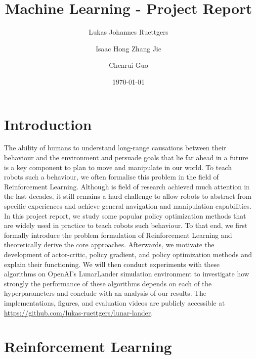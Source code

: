 \documentclass[a4paper, 11pt]{article}
\title{Machine Learning -  Project Report}
\author{Lukas Johannes Ruettgers \and Isaac Hong Zhang Jie \and Chenrui Guo}
\date{\today}
\begin{document}
	\maketitle
	\section{Introduction}
	The ability of humans to understand long-range causations between their behaviour and the environment and persuade goals that lie far ahead in a future is a key component to plan to move and manipulate in our world.
	To teach robots such a behaviour, we often formalise this problem in the field of Reinforcement Learning. Although is field of research achieved much attention in the last decades, it still remains a hard challenge to allow robots to abstract from specific experiences and achieve general navigation and manipulation capabilities. In this project report, we study some popular policy optimization methods that are widely used in practice to teach robots such behaviour.
	To that end, we first formally introduce the problem formulation of Reinforcement Learning and theoretically derive the core approaches. Afterwards, we motivate the development of actor-critic, policy gradient, and policy optimization methods and explain their functioning.
	We will then conduct experiments with these algorithms on OpenAI's LunarLander simulation environment to investigate how strongly the performance of these algorithms depends on each of the hyperparameters and conclude with an analysis of our results. The implementations, figures, and evaluation videos are publicly accessible at \url{https://github.com/lukas-ruettgers/lunar-lander}.
	\section{Reinforcement Learning}
\end{document}
